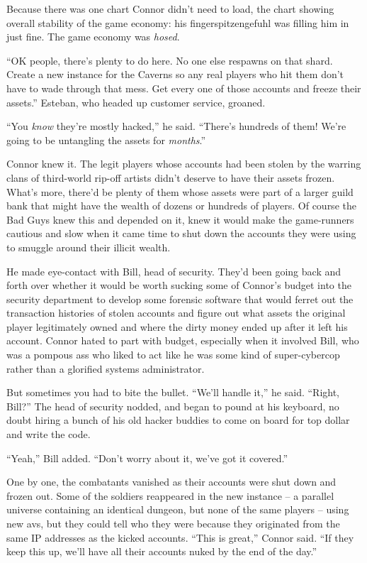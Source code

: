 Because there was one chart Connor didn't need to load, the chart
showing overall stability of the game economy: his
fingerspitzengefuhl was filling him in just fine. The game economy
was \emph{hosed}.

``OK people, there's plenty to do here. No one else respawns on that
shard. Create a new instance for the Caverns so any real players
who hit them don't have to wade through that mess. Get every one of
those accounts and freeze their assets.'' Esteban, who headed up
customer service, groaned.

``You \emph{know} they're mostly hacked,'' he said. ``There's hundreds
of them! We're going to be untangling the assets for
\emph{months}.''

Connor knew it. The legit players whose accounts had been stolen by
the warring clans of third-world rip-off artists didn't deserve to
have their assets frozen. What's more, there'd be plenty of them
whose assets were part of a larger guild bank that might have the
wealth of dozens or hundreds of players. Of course the Bad Guys
knew this and depended on it, knew it would make the game-runners
cautious and slow when it came time to shut down the accounts they
were using to smuggle around their illicit wealth.

He made eye-contact with Bill, head of security. They'd been going
back and forth over whether it would be worth sucking some of
Connor's budget into the security department to develop some
forensic software that would ferret out the transaction histories
of stolen accounts and figure out what assets the original player
legitimately owned and where the dirty money ended up after it left
his account. Connor hated to part with budget, especially when it
involved Bill, who was a pompous ass who liked to act like he was
some kind of super-cybercop rather than a glorified systems
administrator.

But sometimes you had to bite the bullet. ``We'll handle it,'' he
said. ``Right, Bill?'' The head of security nodded, and began to
pound at his keyboard, no doubt hiring a bunch of his old hacker
buddies to come on board for top dollar and write the code.

``Yeah,'' Bill added. ``Don't worry about it, we've got it covered.''

One by one, the combatants vanished as their accounts were shut
down and frozen out. Some of the soldiers reappeared in the new
instance -- a parallel universe containing an identical dungeon,
but none of the same players -- using new avs, but they could tell
who they were because they originated from the same IP addresses as
the kicked accounts. ``This is great,'' Connor said. ``If they keep
this up, we'll have all their accounts nuked by the end of the
day.''


